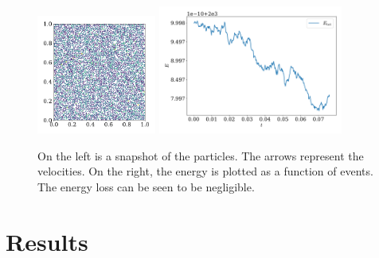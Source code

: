 \documentclass{article}
\begin{document}
        \begin{figure}
            \centering
            \includegraphics[width=0.35\textwidth]{../plots/test_case_many_particles/test_case_many_particles.pdf}
            \includegraphics[width=0.54\textwidth]{../plots/test_case_many_particles/energy.pdf}
            \caption{On the left is a snapshot of the particles. The arrows represent the velocities. On the right, the energy is plotted as a function of events. The energy loss can be seen to be negligible.}
            \label{test many particles}
        \end{figure}

        \section*{Results}
\end{document}
